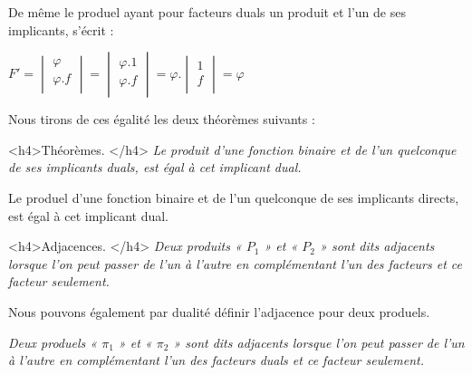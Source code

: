\begin{itemize}
De même le produel ayant pour facteurs duals un produit et l'un de ses implicants, s'écrit : 

\centerline  {
$ F' = \begin{vmatrix} \varphi \\  \varphi . f \\ \end{vmatrix} = \begin{vmatrix} \varphi .1 \\ \varphi  . f \\ \end{vmatrix} = \varphi . \begin{vmatrix} 1  \\  f \\ \end{vmatrix} = \varphi $   
} 

\end{itemize}

Nous tirons de ces égalité les deux théorèmes suivants : 

<h4>Théorèmes. </h4> \emph{
Le produit d'une fonction binaire et de l'un quelconque de ses implicants duals, est égal à cet implicant dual. } 

\centerline{  } 

Le produel d'une fonction binaire et de l'un quelconque de ses implicants directs, est égal à cet implicant dual.  

\centerline{  } 

<h4>Adjacences. </h4> \emph{ Deux produits « $P_1$ » et « $P_2$ » sont dits adjacents lorsque l'on peut passer de l'un à l'autre en complémentant l'un des facteurs et ce facteur seulement. }






Nous pouvons également par dualité définir l'adjacence pour deux produels. 

\emph{Deux produels « ${\pi}_1$ »  et  « ${\pi}_2$ »  sont dits adjacents lorsque l'on peut passer de l'un à l'autre en complémentant l'un des facteurs duals et ce facteur seulement.  } 



